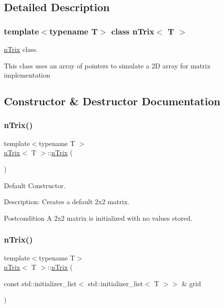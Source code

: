 \subsection{Detailed Description}
\subsubsection*{template$<$typename T$>$\newline
class n\+Trix$<$ T $>$}

\hyperlink{classnTrix}{n\+Trix} class. 

This class uses an array of pointers to simulate a 2D array for matrix implementation 

\subsection{Constructor \& Destructor Documentation}
\mbox{\label{classnTrix_a1f99b7fa79bb2f28ffd014591c55d3a1}} 
\subsubsection{\texorpdfstring{n\+Trix()}{nTrix()}\hspace{0.1cm}{\footnotesize\ttfamily [1/5]}}
{\footnotesize\ttfamily template$<$typename T $>$ \\
\hyperlink{classnTrix}{n\+Trix}$<$ T $>$\+::\hyperlink{classnTrix}{n\+Trix} (\begin{DoxyParamCaption}{ }\end{DoxyParamCaption})}



Default Constructor. 

Description\+: Creates a default 2x2 matrix. \begin{DoxyPostcond}{Postcondition}
A 2x2 matrix is initialized with no values stored. 
\end{DoxyPostcond}
\mbox{\label{classnTrix_ad7dd393c0056a77c9ebeb551112e2f7c}} 
\subsubsection{\texorpdfstring{n\+Trix()}{nTrix()}\hspace{0.1cm}{\footnotesize\ttfamily [2/5]}}
{\footnotesize\ttfamily template$<$typename T$>$ \\
\hyperlink{classnTrix}{n\+Trix}$<$ T $>$\+::\hyperlink{classnTrix}{n\+Trix} (\begin{DoxyParamCaption}\item[{const std\+::initializer\+\_\+list$<$ std\+::initializer\+\_\+list$<$ T $>$$>$ \&}]{grid }\end{DoxyParamCaption})}




